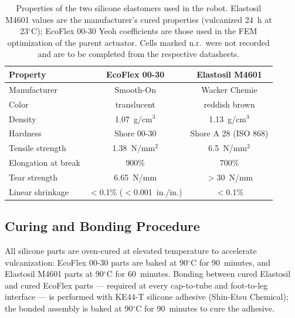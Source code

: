 \begin{table}[tb]
  \caption{Properties of the two silicone elastomers used in the robot.
  Elastosil M4601 values are the manufacturer's cured properties
  (vulcanized 24~h at 23$^{\circ}$C); EcoFlex 00-30 Yeoh coefficients are
  those used in the FEM optimization of the parent actuator. Cells marked
  n.r.\ were not recorded and are to be completed from the respective
  datasheets.}
  \label{tab:lizard-materials}
  \centering
  \begin{tabular}{|l|c|c|}
    \hline
    Property & EcoFlex 00-30 & Elastosil M4601 \\ \hline
    Manufacturer & Smooth-On & Wacker Chemie \\ \hline
    Color & translucent & reddish brown \\ \hline
    Density & 1.07~g/cm$^3$ & 1.13~g/cm$^3$ \\ \hline
    Hardness & Shore 00-30 & Shore A 28 (ISO 868) \\ \hline
    Tensile strength & 1.38~N/mm$^2$ & 6.5~N/mm$^2$ \\ \hline
    Elongation at break & 900\% & 700\% \\ \hline
    Tear strength & 6.65~N/mm & $>$30~N/mm  \\ \hline
    Linear shrinkage & $<$0.1\% ($<$0.001~in./in.) & $<$0.1\% \\ \hline
  \end{tabular}
\end{table}

\subsection{Curing and Bonding Procedure}

All silicone parts are oven-cured at elevated temperature to accelerate
vulcanization: EcoFlex 00-30 parts are baked at 90$^{\circ}$C for
90~minutes, and Elastosil M4601 parts at 90$^{\circ}$C for 60~minutes.
Bonding between cured Elastosil and cured EcoFlex parts --- required at
every cap-to-tube and foot-to-leg interface --- is performed with KE44-T
silicone adhesive (Shin-Etsu Chemical); the bonded assembly is baked at
90$^{\circ}$C for 90~minutes to cure the adhesive.
